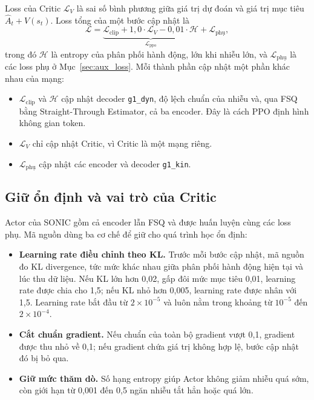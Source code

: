 \documentclass[12pt,a4paper,oneside]{report}
\newcommand{\code}[1]{\texttt{#1}}
\begin{document}
Loss của Critic $\mathcal{L}_V$ là sai số bình phương giữa giá trị dự đoán và giá trị mục tiêu $\hat A_t + V(s_t)$. Loss tổng của một bước cập nhật là
\begin{equation}
\mathcal{L} = \underbrace{\mathcal{L}_{\text{clip}} + 1{,}0 \cdot \mathcal{L}_{V} - 0{,}01 \cdot \mathcal{H}}_{\mathcal{L}_{\text{ppo}}} + \mathcal{L}_{\text{phụ}},
\label{eq:ppo_total}
\end{equation}
trong đó $\mathcal{H}$ là entropy của phân phối hành động, lớn khi nhiễu lớn, và $\mathcal{L}_{\text{phụ}}$ là các loss phụ ở Mục~\ref{sec:aux_loss}. Mỗi thành phần cập nhật một phần khác nhau của mạng:
\begin{itemize}
\item $\mathcal{L}_{\text{clip}}$ và $\mathcal{H}$ cập nhật decoder \code{g1\_dyn}, độ lệch chuẩn của nhiễu và, qua FSQ bằng Straight-Through Estimator, cả ba encoder. Đây là cách PPO định hình không gian token.
\item $\mathcal{L}_{V}$ chỉ cập nhật Critic, vì Critic là một mạng riêng.
\item $\mathcal{L}_{\text{phụ}}$ cập nhật các encoder và decoder \code{g1\_kin}.
\end{itemize}

\subsection{Giữ ổn định và vai trò của Critic}
\label{sec:ppo_stable}

Actor của SONIC gồm cả encoder lẫn FSQ và được huấn luyện cùng các loss phụ. Mã nguồn dùng ba cơ chế để giữ cho quá trình học ổn định:
\begin{itemize}
\item \textbf{Learning rate điều chỉnh theo KL.} Trước mỗi bước cập nhật, mã nguồn đo KL divergence, tức mức khác nhau giữa phân phối hành động hiện tại và lúc thu dữ liệu. Nếu KL lớn hơn 0,02, gấp đôi mức mục tiêu 0,01, learning rate được chia cho 1,5; nếu KL nhỏ hơn 0,005, learning rate được nhân với 1,5. Learning rate bắt đầu từ $2 \times 10^{-5}$ và luôn nằm trong khoảng từ $10^{-5}$ đến $2 \times 10^{-4}$.
\item \textbf{Cắt chuẩn gradient.} Nếu chuẩn của toàn bộ gradient vượt 0,1, gradient được thu nhỏ về 0,1; nếu gradient chứa giá trị không hợp lệ, bước cập nhật đó bị bỏ qua.
\item \textbf{Giữ mức thăm dò.} Số hạng entropy giúp Actor không giảm nhiễu quá sớm, còn giới hạn từ 0,001 đến 0,5 ngăn nhiễu tắt hẳn hoặc quá lớn.
\end{itemize}
\end{document}
